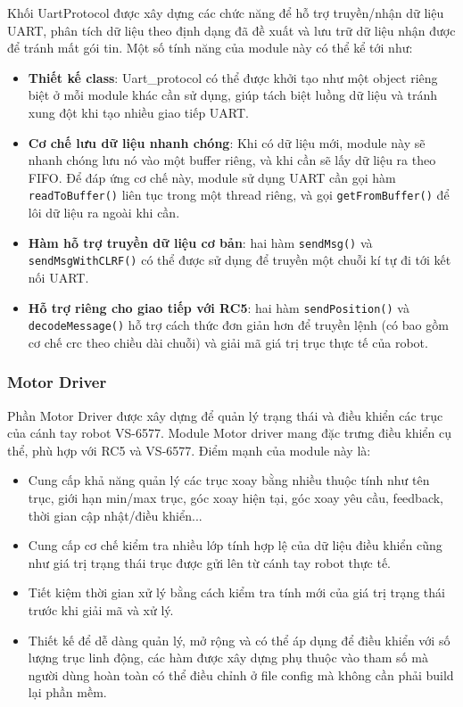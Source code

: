 Khối UartProtocol được xây dựng các chức năng để hỗ trợ truyền/nhận dữ liệu UART, phân tích dữ liệu theo định dạng đã đề xuất và lưu trữ dữ liệu nhận được để tránh mất gói tin. Một số tính năng của module này có thể kể tới như:
\begin{itemize}
    \item \textbf{Thiết kế class}: Uart\_protocol có thể được khởi tạo như một object riêng biệt ở mỗi module khác cần sử dụng, giúp tách biệt luồng dữ liệu và tránh xung đột khi tạo nhiều giao tiếp UART.
    
    \item \textbf{Cơ chế lưu dữ liệu nhanh chóng}: Khi có dữ liệu mới, module này sẽ nhanh chóng lưu nó vào một buffer riêng, và khi cần sẽ lấy dữ liệu ra theo FIFO. Để đáp ứng cơ chế này, module sử dụng UART cần gọi hàm \lstinline[style=inlinecode]{readToBuffer()} liên tục trong một thread riêng, và gọi \lstinline[style=inlinecode]{getFromBuffer()} để lôi dữ liệu ra ngoài khi cần.
    
    \item \textbf{Hàm hỗ trợ truyền dữ liệu cơ bản}: hai hàm \lstinline[style=inlinecode]{sendMsg()} và \lstinline[style=inlinecode]{sendMsgWithCLRF()} có thể được sử dụng để truyền một chuỗi kí tự đi tới kết nối UART.
    
    \item \textbf{Hỗ trợ riêng cho giao tiếp với RC5}: hai hàm \lstinline[style=inlinecode]{sendPosition()} và \lstinline[style=inlinecode]{decodeMessage()} hỗ trợ cách thức đơn giản hơn để truyền lệnh (có bao gồm cơ chế crc theo chiều dài chuỗi) và giải mã giá trị trục thực tế của robot.
    
\end{itemize}

\subsubsection{Motor Driver}

Phần Motor Driver được xây dựng để quản lý trạng thái và điều khiển các trục của cánh tay robot VS-6577. Module Motor driver mang đặc trưng điều khiển cụ thể, phù hợp với RC5 và VS-6577. Điểm mạnh của module này là: 
\begin{itemize}
    \item Cung cấp khả năng quản lý các trục xoay bằng nhiều thuộc tính như tên trục, giới hạn min/max trục, góc xoay hiện tại, góc xoay yêu cầu, feedback, thời gian cập nhật/điều khiển...
    \item Cung cấp cơ chế kiểm tra nhiều lớp tính hợp lệ của dữ liệu điều khiển cũng như giá trị trạng thái trục được gửi lên từ cánh tay robot thực tế.
    \item Tiết kiệm thời gian xử lý bằng cách kiểm tra tính mới của giá trị trạng thái trước khi giải mã và xử lý.
    \item Thiết kế để dễ dàng quản lý, mở rộng và có thể áp dụng để điều khiển với số lượng trục linh động, các hàm được xây dựng phụ thuộc vào tham số mà người dùng hoàn toàn có thể điều chỉnh ở file config mà không cần phải build lại phần mềm.
\end{itemize}

